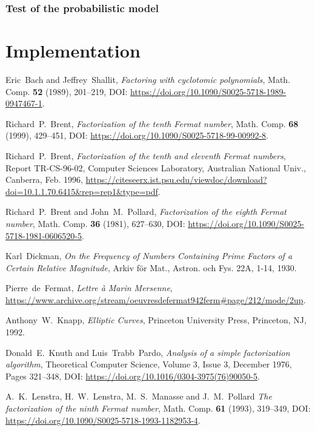 \documentclass[a4paper, 11pt, pdftex]{report}
\theoremstyle{plain}
\theoremstyle{definition}
\begin{document}
\subsection{Test of the probabilistic model}



\chapter{Implementation}

\begin{thebibliography}{99}

 Eric~Bach and Jeffrey~Shallit, \emph{Factoring with cyclotomic polynomials},
Math. Comp. \textbf{52} (1989), 201--219, DOI: \url{https://doi.org/10.1090/S0025-5718-1989-0947467-1}.

 Richard~P.~Brent, \emph{Factorization of the tenth Fermat number}, Math. Comp.
\textbf{68} (1999), 429--451, DOI: \url{https://doi.org/10.1090/S0025-5718-99-00992-8}.

 Richard~P.~Brent, \emph{Factorization of the tenth and eleventh Fermat numbers},
Report TR-CS-96-02, Computer Sciences Laboratory, Australian National Univ., Canberra, Feb. 1996,
\url{https://citeseerx.ist.psu.edu/viewdoc/download?doi=10.1.1.70.6415&rep=rep1&type=pdf}.

 Richard~P.~Brent and John~M.~Pollard, \emph{Factorization of the eighth
Fermat number}, Math. Comp. \textbf{36} (1981), 627--630, DOI:
\url{https://doi.org/10.1090/S0025-5718-1981-0606520-5}.

 Karl~Dickman, \emph{On the Frequency of Numbers Containing Prime Factors
of a Certain Relative Magnitude}, Arkiv för Mat., Astron. och Fys. 22A, 1-14, 1930. 

 Pierre~de~Fermat, \emph{Lettre à Marin Mersenne},
\url{https://www.archive.org/stream/oeuvresdefermat942ferm#page/212/mode/2up}.

 Anthony~W.~Knapp, \emph{Elliptic Curves}, Princeton University Press,
Princeton, NJ, 1992.

 Donald~E.~Knuth and Luis~Trabb~Pardo, \emph{Analysis of a simple
factorization algorithm}, Theoretical Computer Science, Volume 3, Issue 3, December 1976,
Pages 321--348, DOI: \url{https://doi.org/10.1016/0304-3975(76)90050-5}.

 A.~K.~Lenstra, H.~W.~Lenstra, M.~S.~Manasse and J.~M.~Pollard
\emph{The factorization of the ninth Fermat number}, Math. Comp. \textbf{61} (1993), 319--349,
DOI: \url{https://doi.org/10.1090/S0025-5718-1993-1182953-4}.


\end{thebibliography}
\end{document}
